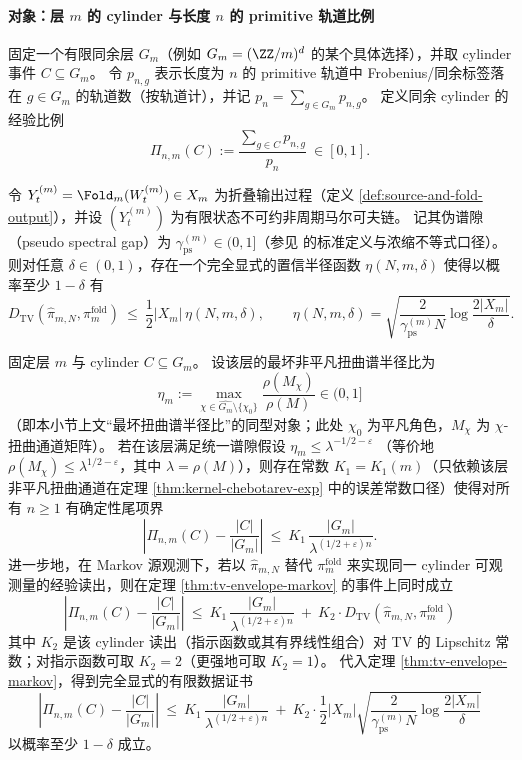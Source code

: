 \paragraph{对象：层 \(m\) 的 cylinder 与长度 \(n\) 的 primitive 轨道比例}
固定一个有限同余层 \(G_m\)（例如 \(G_m=(\ZZ/m)^d\) 的某个具体选择），并取 cylinder 事件 \(C\subseteq G_m\)。
令 \(p_{n,g}\) 表示长度为 \(n\) 的 primitive 轨道中 Frobenius/同余标签落在 \(g\in G_m\) 的轨道数（按轨道计），并记 \(p_n=\sum_{g\in G_m}p_{n,g}\)。
定义同余 cylinder 的经验比例
\[
\Pi_{n,m}(C):=\frac{\sum_{g\in C}p_{n,g}}{p_n}\ \in[0,1].
\]

\begin{theorem}\label{thm:tv-envelope-markov}
令 \(Y_t^{(m)}=\Fold_m(W_t^{(m)})\in X_m\) 为折叠输出过程（定义 \ref{def:source-and-fold-output}），并设 \((Y_t^{(m)})\) 为有限状态不可约非周期马尔可夫链。
记其伪谱隙（pseudo spectral gap）为 \(\gamma_{\mathrm{ps}}^{(m)}\in(0,1]\)（参见 \cite{Paulin2015MarkovConcentration} 的标准定义与浓缩不等式口径）。
则对任意 \(\delta\in(0,1)\)，存在一个完全显式的置信半径函数 \(\eta(N,m,\delta)\) 使得以概率至少 \(1-\delta\) 有
\[
D_{\mathrm{TV}}(\hat{\pi}_{m,N},\pi_m^{\mathrm{fold}})
\ \le\
\frac12|X_m|\,\eta(N,m,\delta),
\qquad
\eta(N,m,\delta)
=\sqrt{\frac{2}{\gamma_{\mathrm{ps}}^{(m)}N}\log\frac{2|X_m|}{\delta}}.
\]
\end{theorem}

\begin{theorem}\label{thm:auditable-profinite-chebotarev-finite}
固定层 \(m\) 与 cylinder \(C\subseteq G_m\)。
设该层的最坏非平凡扭曲谱半径比为
\[
\eta_m:=\max_{\chi\in\widehat{G_m}\setminus\{\chi_0\}}\frac{\rho(M_\chi)}{\rho(M)}\in(0,1]
\]
（即本小节上文“最坏扭曲谱半径比”的同型对象；此处 \(\chi_0\) 为平凡角色，\(M_\chi\) 为 \(\chi\)-扭曲通道矩阵）。
若在该层满足统一谱隙假设
\(
\eta_m\le \lambda^{-1/2-\varepsilon}
\)
（等价地 \(\rho(M_\chi)\le \lambda^{1/2-\varepsilon}\)，其中 \(\lambda=\rho(M)\)），则存在常数 \(K_1=K_1(m)\)（只依赖该层非平凡扭曲通道在定理 \ref{thm:kernel-chebotarev-exp} 中的误差常数口径）使得对所有 \(n\ge 1\) 有确定性尾项界
\[
\left|\Pi_{n,m}(C)-\frac{|C|}{|G_m|}\right|
\ \le\
K_1\,\frac{|G_m|}{\lambda^{(1/2+\varepsilon)n}}.
\]
进一步地，在 Markov 源观测下，若以 \(\hat{\pi}_{m,N}\) 替代 \(\pi_m^{\mathrm{fold}}\) 来实现同一 cylinder 可观测量的经验读出，则在定理 \ref{thm:tv-envelope-markov} 的事件上同时成立
\[
\boxed{\;
\left|\Pi_{n,m}(C)-\frac{|C|}{|G_m|}\right|
\ \le\
K_1\,\frac{|G_m|}{\lambda^{(1/2+\varepsilon)n}}
\ +\
K_2\cdot D_{\mathrm{TV}}(\hat{\pi}_{m,N},\pi_m^{\mathrm{fold}})
\;}
\]
其中 \(K_2\) 是该 cylinder 读出（指示函数或其有界线性组合）对 TV 的 Lipschitz 常数；对指示函数可取 \(K_2=2\)（更强地可取 \(K_2=1\)）。
代入定理 \ref{thm:tv-envelope-markov}，得到完全显式的有限数据证书
\[
\boxed{\;
\left|\Pi_{n,m}(C)-\frac{|C|}{|G_m|}\right|
\ \le\
K_1\,\frac{|G_m|}{\lambda^{(1/2+\varepsilon)n}}
\ +\
K_2\cdot \frac12|X_m|\sqrt{\frac{2}{\gamma_{\mathrm{ps}}^{(m)}N}\log\frac{2|X_m|}{\delta}}
\;}
\]
以概率至少 \(1-\delta\) 成立。
\end{theorem}


